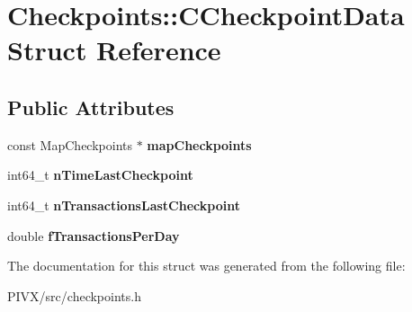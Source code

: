 \hypertarget{struct_checkpoints_1_1_c_checkpoint_data}{}\section{Checkpoints\+:\+:C\+Checkpoint\+Data Struct Reference}
\label{struct_checkpoints_1_1_c_checkpoint_data}
\subsection*{Public Attributes}
\begin{DoxyCompactItemize}
\item 
\mbox{\label{struct_checkpoints_1_1_c_checkpoint_data_ab4aa42cde482f7cf7ab015abbf7108cb}} 
const Map\+Checkpoints $\ast$ {\bfseries map\+Checkpoints}
\item 
\mbox{\label{struct_checkpoints_1_1_c_checkpoint_data_a49124425a3f9ccddba8bce3dd67ad3b3}} 
int64\+\_\+t {\bfseries n\+Time\+Last\+Checkpoint}
\item 
\mbox{\label{struct_checkpoints_1_1_c_checkpoint_data_ad659d70f627b0c4529fc0e71f568de70}} 
int64\+\_\+t {\bfseries n\+Transactions\+Last\+Checkpoint}
\item 
\mbox{\label{struct_checkpoints_1_1_c_checkpoint_data_a9119b43d2bc8e47df84f14c230a1762d}} 
double {\bfseries f\+Transactions\+Per\+Day}
\end{DoxyCompactItemize}


The documentation for this struct was generated from the following file\+:\begin{DoxyCompactItemize}
\item 
P\+I\+V\+X/src/checkpoints.\+h\end{DoxyCompactItemize}
